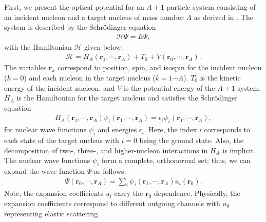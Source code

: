 \documentclass[preprintnumbers,floatfix,aps,prc,preprint,nofootinbib]{revtex4-1}
\begin{document}
First, we present the optical potential for an $A+1$ particle system consisting of an incident nucleon and a target nucleus of mass number $A$ as derived in \cite{Feshbach:1958nx}. The system is described by the Schr\"odinger equation
%
\begin{eqnarray}
	\label{eq:schrodinger_equation}
	\mathcal{H} \Psi = E \Psi,
\end{eqnarray}
%
with the Hamiltonian $\mathcal{H}$ given below:
%
\begin{eqnarray}
	\label{eq:total_hamiltonian}
	\mathcal{H} = H_A(\textbf{r}_1, \cdots , \textbf{r}_A) + T_0 + V(\textbf{r}_0, \cdots , \textbf{r}_A).
\end{eqnarray}
%
The variables $\textbf{r}_k$ correspond to position, spin, and isospin for the incident nucleon ($k=0$) and each nucleon in the target nucleus ($k=1 \cdots A$). $T_0$ is the kinetic energy of the incident nucleon, and $V$ is the potential energy of the $A+1$ system. $H_A$ is the Hamiltonian for the target nucleus and satisfies the Schr\"odinger equation
%
\begin{eqnarray}
	\label{eq:nuclear_schrodinger_equation}
	H_A(\textbf{r}_1, \cdots , \textbf{r}_A) \psi_i(\textbf{r}_1, \cdots , \textbf{r}_A) = \epsilon_i \psi_i(\textbf{r}_1, \cdots , \textbf{r}_A),
\end{eqnarray}
%
for nuclear wave functions $\psi_i$ and energies $\epsilon_i$. Here, the index $i$ corresponds to each state of the target nucleus with $i=0$ being the ground state. Also, the decomposition of two-, three-, and higher-nucleon interactions in $H_A$ is implicit. The nuclear wave functions $\psi_i$ form a complete, orthonormal set; thus, we can expand the wave function $\Psi$ as follows:
%
\begin{eqnarray}
	\label{eq:wave_function}
	\Psi(\textbf{r}_0, \cdots , \textbf{r}_A) = \sum_{i} \psi_i(\textbf{r}_1, \cdots , \textbf{r}_A) u_i(\textbf{r}_0).
\end{eqnarray}
%
Note, the expansion coefficients $u_i$ carry the $\textbf{r}_0$ dependence. Physically, the expansion coefficients correspond to different outgoing channels with $u_0$ representing elastic scattering.
\\
\end{document}
